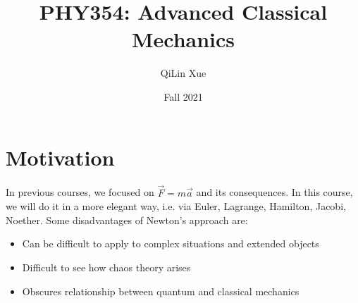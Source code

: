 \documentclass{article}
\title{PHY354: Advanced Classical Mechanics}
\author{QiLin Xue}
\date{Fall 2021}
\numberwithin{equation}{section}
\begin{document}
\maketitle
\tableofcontents
\newpage
\section{Motivation}
In previous courses, we focused on $\vec{F}=m\vec{a}$ and its consequences. In this course, we will do it in a more elegant way, i.e. via Euler, Lagrange, Hamilton, Jacobi, Noether.  Some disadvantages of Newton's approach are:
\begin{itemize}
    \item Can be difficult to apply to complex situations and extended objects
    \item Difficult to see how chaos theory arises
    \item Obscures relationship between quantum and classical mechanics
\end{itemize}
\end{document}
